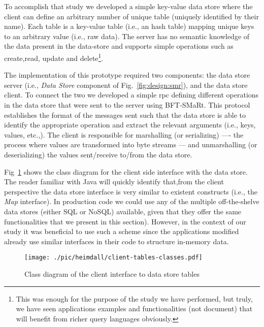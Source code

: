 To accomplish that study we developed a simple key-value data store where the client can define an arbitrary number of unique table (uniquely identified by their name). Each table is a key-value table (i.e., an hash table) mapping unique keys to an arbitrary value (i.e., raw data). The server has no semantic knowledge of the data present in the data-store and supports simple operations such as create,read, update and delete\footnote{This was enough for the purpose of  the study we have performed, but truly, we have seen applications examples and functionalities (not document) that will benefit from richer query languages obviously.}. 

The implementation of this prototype required two components: the  data store server (i.e., \emph{Data Store} component of Fig.~\ref{fig:design:smr}), and the data store  client.  To connect the two we developed a simple \gls{rpc} defining different operations in the data store that were sent to the server using BFT-SMaRt. This protocol establishes the format of the messages sent such that the data store is able to identify the appropriate operation and extract the relevant arguments (i.e., keys, values, etc.,). 
The client is responsible for marshalling (or serializing) ---- the process where values are transformed into byte streams --- and unmarshalling (or deserializing)  the values sent/receive to/from the data store. 

Fig~\ref{fig:design:class-diagram} shows the class diagram for the client side interface with the data store.  
The reader familiar with Java will quickly identify that,from the client perspective the data store interface is very similar to existent constructs (i.e., the \emph{Map} interface). In production code we could use any of the multiple off-the-shelve data stores (either SQL or NoSQL) available, given that they offer the same functionalities that we present in this section). However, in the context of our study it was beneficial to use such a scheme since the applications modified already use similar interfaces in their code to structure in-memory data.\\

\begin{figure}[ht]
  \centering
  \texttt{[image: ./pic/heimdall/client-tables-classes.pdf]}
  \caption[Client Interfaces for the data store]{Class diagram of the client interface to data store tables}
\label{fig:design:class-diagram}
\end{figure}

